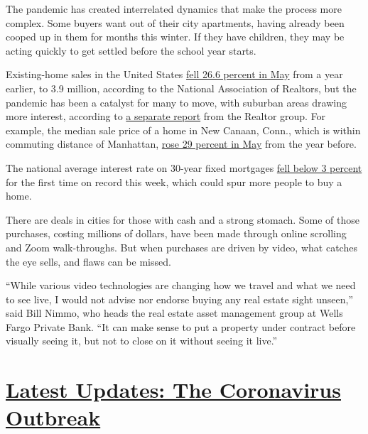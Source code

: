 The pandemic has created interrelated dynamics that make the process
more complex. Some buyers want out of their city apartments, having
already been cooped up in them for months this winter. If they have
children, they may be acting quickly to get settled before the school
year starts.

Existing-home sales in the United States
\href{https://www.nar.realtor/newsroom/existing-home-sales-fall-9-7-in-may-while-nar-expects-strong-rebound-in-coming-months}{fell
26.6 percent in May} from a year earlier, to 3.9 million, according to
the National Association of Realtors, but the pandemic has been a
catalyst for many to move, with suburban areas drawing more interest,
according to
\href{https://www.nar.realtor/sites/default/files/documents/2020-market-recovery-survey-07-09-2020.pdf}{a
separate report} from the Realtor group. For example, the median sale
price of a home in New Canaan, Conn., which is within commuting distance
of Manhattan,
\href{https://newcanaanite.com/new-canaan-home-sales-median-price-up-29-in-may-3046583}{rose
29 percent in May} from the year before.

The national average interest rate on 30-year fixed mortgages
\href{https://www.nytimes3xbfgragh.onion/2020/07/16/business/mortgage-rates-below-3-percent.html}{fell
below 3 percent} for the first time on record this week, which could
spur more people to buy a home.

There are deals in cities for those with cash and a strong stomach. Some
of those purchases, costing millions of dollars, have been made through
online scrolling and Zoom walk-throughs. But when purchases are driven
by video, what catches the eye sells, and flaws can be missed.

``While various video technologies are changing how we travel and what
we need to see live, I would not advise nor endorse buying any real
estate sight unseen,'' said Bill Nimmo, who heads the real estate asset
management group at Wells Fargo Private Bank. ``It can make sense to put
a property under contract before visually seeing it, but not to close on
it without seeing it live.''

\hypertarget{latest-updates-the-coronavirus-outbreak}{%
\section{\texorpdfstring{\href{https://www.nytimes3xbfgragh.onion/2020/08/20/world/coronavirus-covid.html?action=click\&pgtype=Article\&state=default\&region=MAIN_CONTENT_1\&context=storylines_live_updates}{Latest
Updates: The Coronavirus
Outbreak}}{Latest Updates: The Coronavirus Outbreak}}\label{latest-updates-the-coronavirus-outbreak}}

